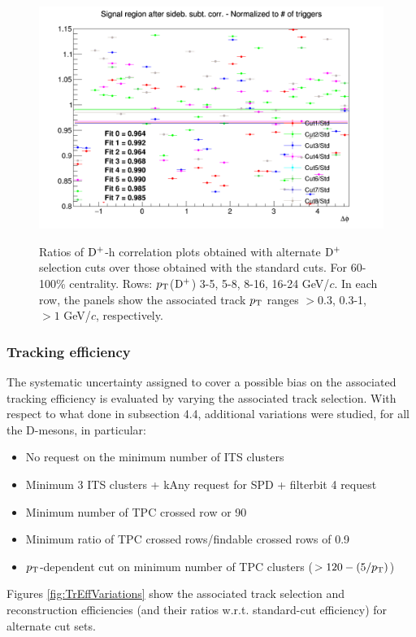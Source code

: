 \begin{figure}
{\includegraphics[width=0.31\linewidth]{Centrality_DPlus/Dplus/Systematic/60_100/Cut/Ratio_AzimCorrDistr_Dplus_Canvas_PtIntBins11to11_PoolInt_thr1dotto99dot.png}} \\
 \caption{Ratios of ${\rm D^+}$-h correlation plots obtained with alternate ${\rm D^+}$ selection cuts over those obtained with the standard cuts. For 60-100\% centrality. Rows: $p_{\rm T}$(${\rm D^+}$) 3-5, 5-8, 8-16, 16-24 GeV/$c$. In each row, the panels show the associated track
$p_{\rm T}$ ranges $> 0.3$, 0.3-1, $> 1$ GeV/$c$, respectively.}
\label{fig:SysDcut60100_Dplus}
\end{figure}
\clearpage

\subsubsection{Tracking efficiency}
The systematic uncertainty assigned to cover a possible bias on the associated tracking efficiency is evaluated by varying the associated track selection.
With respect to what done in subsection 4.4, additional variations were studied, for all the D-mesons, in particular:
\begin{itemize}
  \item No request on the minimum number of ITS clusters
  \item Minimum 3 ITS clusters + kAny request for SPD + filterbit 4 request
  \item Minimum number of TPC crossed row or 90
  \item Minimum ratio of TPC crossed rows/findable crossed rows of 0.9
  \item $p_{\rm T}$-dependent cut on minimum number of TPC clusters ($> 120-(5/p_{\rm T})$)
\end{itemize}

Figures \ref{fig:TrEffVariations} show the associated track selection and reconstruction efficiencies (and their ratios w.r.t. standard-cut efficiency) for alternate cut sets.

